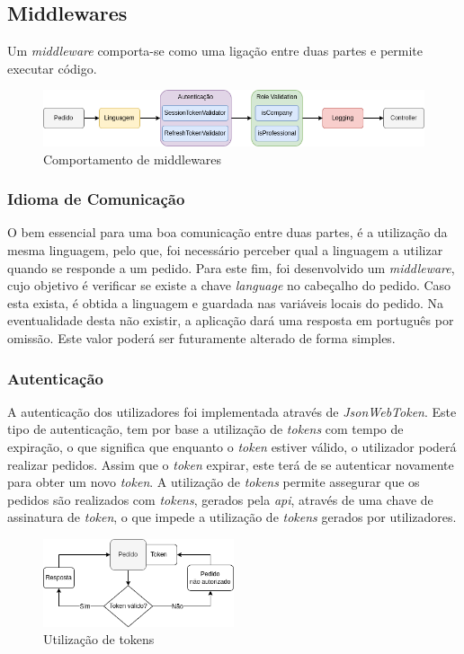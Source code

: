 \subsection{Middlewares} 
Um \textit{middleware} comporta-se como uma ligação entre duas partes e permite executar código.

\begin{figure}[htb]
 \centering
 \includegraphics[width=\textwidth]{images/implementacao/api/middlewares.png}
 \caption{Comportamento de middlewares}
 \label{middlewares_png}
\end{figure}

\subsubsection{Idioma de Comunicação}\label{sec:idioma_comunicacao}
O bem essencial para uma boa comunicação entre duas partes, é a utilização da mesma linguagem, pelo que, foi necessário perceber qual a linguagem a utilizar quando se responde a um pedido. Para este fim, foi desenvolvido um \textit{middleware}, cujo objetivo é verificar se existe a chave \textit{language} no cabeçalho do pedido. Caso esta exista, é obtida a linguagem e guardada nas variáveis locais do pedido. Na eventualidade desta não existir, a aplicação dará uma resposta em português por omissão. Este valor poderá ser futuramente alterado de forma simples.

\newpage

\subsubsection{Autenticação}
A autenticação dos utilizadores foi implementada através de \textit{JsonWebToken}. Este tipo de autenticação, tem por base a utilização de \textit{tokens} com tempo de expiração, o que significa que enquanto o \textit{token} estiver válido, o utilizador poderá realizar pedidos. Assim que o \textit{token} expirar, este terá de se autenticar novamente para obter um novo \textit{token}.
A utilização de \textit{tokens} permite assegurar que os pedidos são realizados com \textit{tokens}, gerados pela \textit{\acrshort{api}}, através de uma chave de assinatura de \textit{token}, o que impede a utilização de \textit{tokens} gerados por utilizadores.
\begin{figure}[htb]
 \centering
 \includegraphics[width=0.5\textwidth]{images/implementacao/api/jwt_session.png}
 \caption{Utilização de tokens}
 \label{fig:64}
\end{figure}

